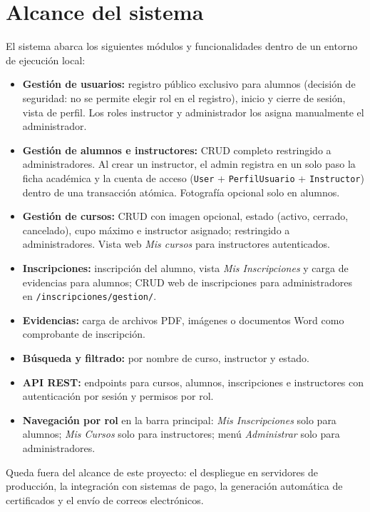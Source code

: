 \documentclass[11pt,letterpaper]{article}
\begin{document}
	\section{Alcance del sistema}
	El sistema abarca los siguientes m\'odulos y funcionalidades dentro de un entorno de ejecuci\'on local:
	\begin{itemize}[leftmargin=*]
		\item \textbf{Gesti\'on de usuarios:} registro p\'ublico exclusivo para alumnos (decisi\'on de seguridad: no se permite elegir rol en el registro), inicio y cierre de sesi\'on, vista de perfil. Los roles instructor y administrador los asigna manualmente el administrador.
		\item \textbf{Gesti\'on de alumnos e instructores:} CRUD completo restringido a administradores. Al crear un instructor, el admin registra en un solo paso la ficha acad\'emica y la cuenta de acceso (\texttt{User} + \texttt{PerfilUsuario} + \texttt{Instructor}) dentro de una transacci\'on at\'omica. Fotograf\'ia opcional solo en alumnos.
		\item \textbf{Gesti\'on de cursos:} CRUD con imagen opcional, estado (activo, cerrado, cancelado), cupo m\'aximo e instructor asignado; restringido a administradores. Vista web \emph{Mis cursos} para instructores autenticados.
		\item \textbf{Inscripciones:} inscripci\'on del alumno, vista \emph{Mis Inscripciones} y carga de evidencias para alumnos; CRUD web de inscripciones para administradores en \texttt{/inscripciones/gestion/}.
		\item \textbf{Evidencias:} carga de archivos PDF, im\'agenes o documentos Word como comprobante de inscripci\'on.
		\item \textbf{B\'usqueda y filtrado:} por nombre de curso, instructor y estado.
		\item \textbf{API REST:} endpoints para cursos, alumnos, inscripciones e instructores con autenticaci\'on por sesi\'on y permisos por rol.
		\item \textbf{Navegaci\'on por rol} en la barra principal: \emph{Mis Inscripciones} solo para alumnos; \emph{Mis Cursos} solo para instructores; men\'u \emph{Administrar} solo para administradores.
	\end{itemize}
	Queda fuera del alcance de este proyecto: el despliegue en servidores de producci\'on, la integraci\'on con sistemas de pago, la generaci\'on autom\'atica de certificados y el env\'io de correos electr\'onicos.
	
\end{document}
